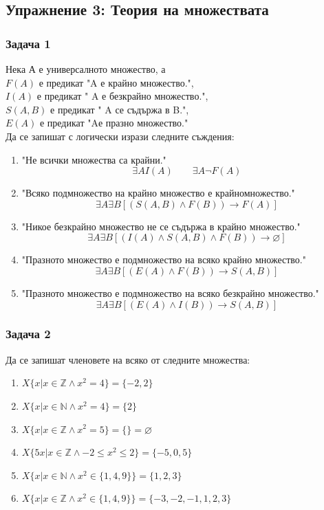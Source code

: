 \documentclass[fleqn, 12pt]{article}
\theoremstyle{definition}
\begin{document}
\subsection{Упражнение 3: Теория на множествата}

\subsubsection*{Задача 1}
Нека А е универсалното множество, а\\
$F(A)$ е предикат "A е крайно множество.",  \\
$I(A)$ е предикат " A е безкрайно множество.", \\
$S(A, B)$ е предикат " A се съдържа в B.", \\
$E(A)$ е предикат "Aе празно множество."  \\
Да се запишат с логически изрази следните съждения:\\
\begin{enumerate}
\item "Не всички множества са крайни."
$$\exists A I(A) \qquad \exists A \neg F(A)$$
\item "Всяко подмножество на крайно множество е крайномножество." 
$$\exists A \exists B [(S(A,B) \land F(B)) \to F(A)]$$
\item "Никое безкрайно множество не се съдържа в крайно множество."
$$\exists A \exists B [(I(A) \land S(A,B) \land F(B)) \to \varnothing]$$
\item "Празното множество е подмножество на всяко крайно множество." 
$$\exists A \exists B [(E(A) \land F(B)) \to S(A,B)]$$
\item "Празното множество е подмножество на всяко безкрайно множество."
$$\exists A \exists B [(E(A) \land I(B)) \to S(A,B)]$$
\end{enumerate}

\subsubsection*{Задача 2}
Да се запишат членовете на всяко от следните множества:
\begin{enumerate}
\item $X\{x \vert x \in \mathbb{Z} \land x^2 = 4 \} = \{-2,2\}$
\item $X\{x \vert x \in \mathbb{N} \land x^2 = 4 \} = \{2\}$
\item $X\{x \vert x \in \mathbb{Z} \land x^2 = 5 \} = \{\} = \varnothing$
\item $X\{5x \vert x \in \mathbb{Z} \land -2 \leq x^2 \leq 2\} = \{-5,0,5\}$
\item $X\{x \vert x \in \mathbb{N} \land x^2 \in \{1, 4, 9\} \} = \{ 1,2,3\}$
\item $X\{x \vert x \in \mathbb{Z} \land x^2 \in \{1, 4, 9\} \} = \{ -3,-2,-1,1,2,3\}$
\end{enumerate}
\end{document}
